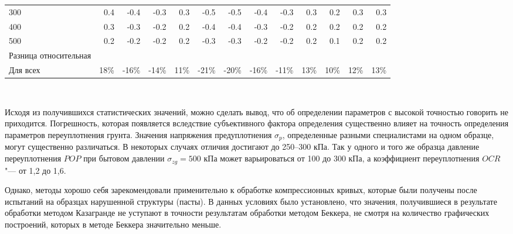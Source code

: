 \begin{sidewaystable}[p]
\begin{tabular}{@{}lrrrrrrrrrrrr@{}}
    300 & 0.4 & -0.4 & -0.3 & 0.3 & -0.5 & -0.5 & -0.4 & -0.3 & 0.3 & 0.2 & 0.3 & 0.3 \\
    400 & 0.3 & -0.3 & -0.2 & 0.2 & -0.4 & -0.4 & -0.3 & -0.2 & 0.2 & 0.2 & 0.2 & 0.2 \\
    500 & 0.2 & -0.2 & -0.2 & 0.2 & -0.3 & -0.3 & -0.2 & -0.2 & 0.2 & 0.1 & 0.2 & 0.2 \\
    \midrule
    Разница относительная &  &  &  &  &  &  &  &  &  &  &  &  \\
    Для всех & 18\% & -16\% & -14\% & 11\% & -21\% & -20\% & -16\% & -11\% & 13\% & 10\% & 12\% & 13\% \\
    \bottomrule
    \end{tabular}
    \\ 
\end{sidewaystable}



Исходя из получившихся статистических значений, можно сделать вывод, что об определении параметров с высокой точностью говорить не приходится. Погрешность, которая появляется вследствие субъективного фактора определения существенно влияет на точность определения параметров переуплотнения грунта.
Значения напряжения предуплотнения $\sigma_p$, определенные разными специалистами на одном образце, могут существенно различаться. В некоторых случаях отличия достигают до 250--300 кПа. Так у одного и того же образца давление переуплотнения $POP$ при бытовом давлении $\sigma_{zg} = 500$ кПа может варьироваться от 100 до 300 кПа, а коэффициент переуплотнения $OCR$ "--- от 1,2 до 1,6.

Однако, методы хорошо себя зарекомендовали применительно к обработке компрессионных кривых, которые были получены после испытаний на образцах нарушенной структуры (пасты). В данных условиях было установлено, что значения, получившиеся в результате обработки методом Казагранде не уступают в точности результатам обработки методом Беккера, не смотря на количество графических построений, которых в методе Беккера значительно меньше. 

